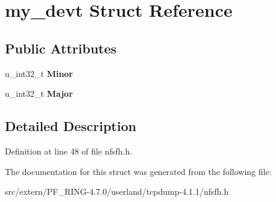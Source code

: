 \hypertarget{structmy__devt}{
\section{my\_\-devt Struct Reference}
\label{structmy__devt}
}
\subsection*{Public Attributes}
\begin{DoxyCompactItemize}
\item 
\hypertarget{structmy__devt_acfd145bf22447568e4d5bb739f080abb}{
u\_\-int32\_\-t {\bfseries Minor}}
\label{structmy__devt_acfd145bf22447568e4d5bb739f080abb}

\item 
\hypertarget{structmy__devt_a21ffc19908e034d5a3bebce2af039247}{
u\_\-int32\_\-t {\bfseries Major}}
\label{structmy__devt_a21ffc19908e034d5a3bebce2af039247}

\end{DoxyCompactItemize}


\subsection{Detailed Description}


Definition at line 48 of file nfsfh.h.



The documentation for this struct was generated from the following file:\begin{DoxyCompactItemize}
\item 
src/extern/PF\_\-RING-\/4.7.0/userland/tcpdump-\/4.1.1/nfsfh.h\end{DoxyCompactItemize}
